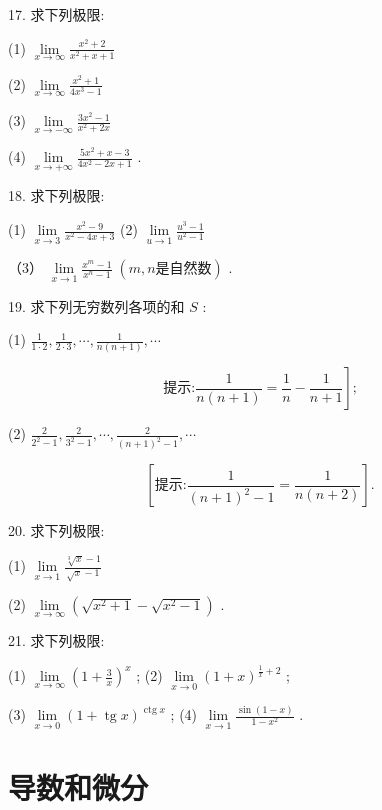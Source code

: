 \documentclass[lang=cn,newtx,10pt,scheme=chinese]{elegantbook}
\begin{document}
17. 求下列极限:

(1) \(\mathop{\lim }\limits_{{x \rightarrow \infty }}\frac{{x}^{2} + 2}{{x}^{2} + x + 1}\)

(2) \(\mathop{\lim }\limits_{{x \rightarrow \infty }}\frac{{x}^{2} + 1}{4{x}^{3} - 1}\)

(3) \(\mathop{\lim }\limits_{{x \rightarrow - \infty }}\frac{3{x}^{2} - 1}{{x}^{2} + {2x}}\)

(4) \(\mathop{\lim }\limits_{{x \rightarrow + \infty }}\frac{5{x}^{2} + x - 3}{4{x}^{2} - {2x} + 1}\) .

18. 求下列极限:

(1) \(\mathop{\lim }\limits_{{x \rightarrow 3}}\frac{{x}^{2} - 9}{{x}^{2} - {4x} + 3}\) (2) \(\mathop{\lim }\limits_{{u \rightarrow 1}}\frac{{u}^{3} - 1}{{u}^{2} - 1}\)

（3） \(\mathop{\lim }\limits_{{x \rightarrow 1}}\frac{{x}^{m} - 1}{{x}^{n} - 1}\;\left( {m,n\text{是自然数}}\right)\) .

19. 求下列无穷数列各项的和 \(S\) :

(1) \(\frac{1}{1 \cdot 2},\frac{1}{2 \cdot 3},\cdots ,\frac{1}{n\left( {n + 1}\right) },\cdots\)

\[
\text{提示:}\left. {\frac{1}{n\left( {n + 1}\right) } = \frac{1}{n} - \frac{1}{n + 1}}\right\rbrack \text{;}
\]

(2) \(\frac{2}{{2}^{2} - 1},\frac{2}{{3}^{2} - 1},\cdots ,\frac{2}{{\left( n + 1\right) }^{2} - 1},\cdots\)

\[
\left\lbrack {\text{提示:}\frac{1}{{\left( n + 1\right) }^{2} - 1} = \frac{1}{n\left( {n + 2}\right) }}\right\rbrack \text{.}
\]

20. 求下列极限:

(1) \(\mathop{\lim }\limits_{{x \rightarrow 1}}\frac{\sqrt[3]{x} - 1}{\sqrt{x} - 1}\)

(2) \(\mathop{\lim }\limits_{{x \rightarrow \infty }}\left( {\sqrt{{x}^{2} + 1} - \sqrt{{x}^{2} - 1}}\right)\) .

21. 求下列极限:

(1) \(\mathop{\lim }\limits_{{x \rightarrow \infty }}{\left( 1 + \frac{3}{x}\right) }^{x}\) ; (2) \(\mathop{\lim }\limits_{{x \rightarrow 0}}{\left( 1 + x\right) }^{\frac{1}{x} + 2}\) ;

(3) \(\mathop{\lim }\limits_{{x \rightarrow 0}}{\left( 1 + \operatorname{tg}x\right) }^{\operatorname{ctg}x}\) ; (4) \(\mathop{\lim }\limits_{{x \rightarrow 1}}\frac{\sin \left( {1 - x}\right) }{1 - {x}^{2}}\) .

\chapter{导数和微分}
\end{document}
